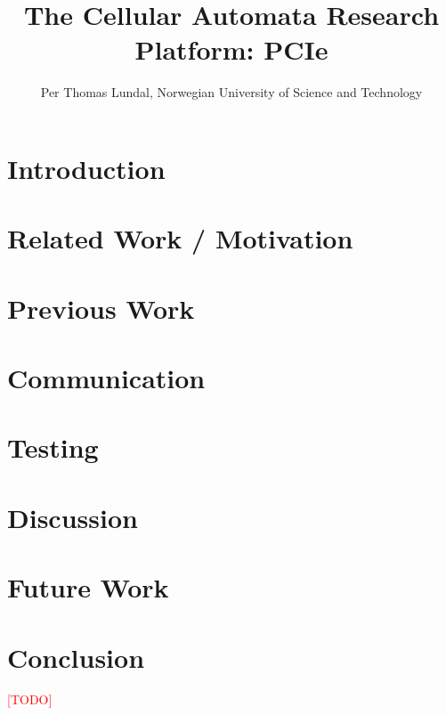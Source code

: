 \documentclass[a4paper]{IEEEtran}
\title{The Cellular Automata Research Platform: PCIe}
\author{Per Thomas Lundal, Norwegian University of Science and Technology}
\newcommand\TODO{\textcolor{red}{[TODO]}}
\begin{document}
\maketitle

\begin{abstract}

    

\end{abstract}

\section{Introduction}

    

\section{Related Work / Motivation}

    

\section{Previous Work}

    

\section{Communication}

    

\section{Testing}

    

\section{Discussion}

    

\section{Future Work}

    

\section{Conclusion}

\TODO



\end{document}

